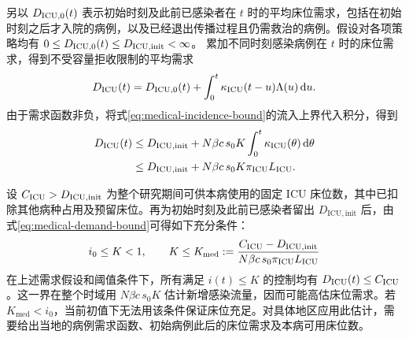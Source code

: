 \documentclass[lang=cn,a4paper,newtx]{elegantpaper}
\theoremstyle{plain}
\theoremstyle{definition}
\newcommand{\dd}{\,\mathrm d}
\begin{document}
另以 $D_{{\rm ICU},0}(t)$ 表示初始时刻及此前已感染者在 $t$ 时的平均床位需求，包括在初始时刻之后才入院的病例，以及已经退出传播过程且仍需救治的病例。假设对各项策略均有 $0\le D_{{\rm ICU},0}(t)\le D_{\mathrm{ICU,init}}<\infty$。
累加不同时刻感染病例在 $t$ 时的床位需求，得到不受容量拒收限制的平均需求
\begin{equation}
D_{\rm ICU}(t)=D_{{\rm ICU},0}(t)+\int_0^t\kappa_{\rm ICU}(t-u)\Lambda(u)\dd u.
\label{eq:medical-demand}
\end{equation}
由于需求函数非负，将式\eqref{eq:medical-incidence-bound}的流入上界代入积分，得到
\begin{equation}
\begin{aligned}
D_{\rm ICU}(t)&\le D_{\mathrm{ICU,init}}+N\beta c\,s_0K\int_0^t\kappa_{\rm ICU}(\theta)\dd \theta\\
&\le D_{\mathrm{ICU,init}}+N\beta c\,s_0K\pi_{\mathrm{ICU}}L_{\rm ICU}.
\end{aligned}
\label{eq:medical-demand-bound}
\end{equation}

设 $C_{\rm ICU}>D_{\mathrm{ICU,init}}$ 为整个研究期间可供本病使用的固定 ICU 床位数，其中已扣除其他病种占用及预留床位。再为初始时刻及此前已感染者留出 $D_{\mathrm{ICU,init}}$ 后，由式\eqref{eq:medical-demand-bound}可得如下充分条件：
\begin{equation}
i_0\le K<1,\qquad
K\le K_{\mathrm{med}}:=
\frac{C_{\rm ICU}-D_{\mathrm{ICU,init}}}{N\beta c\,s_0\pi_{\mathrm{ICU}}L_{\rm ICU}}
\label{eq:medical-threshold}
\end{equation}
在上述需求假设和阈值条件下，所有满足 $i(t)\le K$ 的控制均有 $D_{\rm ICU}(t)\le C_{\rm ICU}$。这一界在整个时域用 $N\beta c\,s_0K$ 估计新增感染流量，因而可能高估床位需求。若 $K_{\mathrm{med}}<i_0$，当前初值下无法用该条件保证床位充足。对具体地区应用此估计，需要给出当地的病例需求函数、初始病例此后的床位需求及本病可用床位数。


\printbibliography[heading=bibintoc,title=\ebibname]
\end{document}
